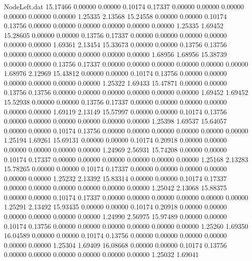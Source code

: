 \begin{filecontents}{NodeLeft.dat}
  15.17466    0.00000    0.00000     0.10174    0.17337    0.00000    0.00000    0.00000    0.00000    0.00000    0.00000    1.25335    2.13568
  15.24558    0.00000    0.00000     0.10174    0.13756    0.00000    0.00000    0.00000    0.00000    0.00000    0.00000    1.25335    1.69452
  15.28605    0.00000    0.00000     0.13756    0.17337    0.00000    0.00000    0.00000    0.00000    0.00000    0.00000    1.69361    2.13454
  15.33673    0.00000    0.00000     0.13756    0.13756    0.00000    0.00000    0.00000    0.00000    0.00000    0.00000    1.68956    1.68956
  15.38739    0.00000    0.00000     0.13756    0.17337    0.00000    0.00000    0.00000    0.00000    0.00000    0.00000    1.68976    2.12969
  15.43812    0.00000    0.00000     0.10174    0.13756    0.00000    0.00000    0.00000    0.00000    0.00000    0.00000    1.25322    1.69433
  15.47871    0.00000    0.00000     0.13756    0.13756    0.00000    0.00000    0.00000    0.00000    0.00000    0.00000    1.69452    1.69452
  15.52938    0.00000    0.00000     0.13756    0.17337    0.00000    0.00000    0.00000    0.00000    0.00000    0.00000    1.69119    2.13149
  15.57997    0.00000    0.00000     0.10174    0.13756    0.00000    0.00000    0.00000    0.00000    0.00000    0.00000    1.25398    1.69537
  15.64057    0.00000    0.00000     0.10174    0.13756    0.00000    0.00000    0.00000    0.00000    0.00000    0.00000    1.25194    1.69261
  15.69131    0.00000    0.00000     0.10174    0.20918    0.00000    0.00000    0.00000    0.00000    0.00000    0.00000    1.24969    2.56931
  15.74208    0.00000    0.00000     0.10174    0.17337    0.00000    0.00000    0.00000    0.00000    0.00000    0.00000    1.25168    2.13283
  15.78265    0.00000    0.00000     0.10174    0.17337    0.00000    0.00000    0.00000    0.00000    0.00000    0.00000    1.25232    2.13392
  15.83314    0.00000    0.00000     0.10174    0.17337    0.00000    0.00000    0.00000    0.00000    0.00000    0.00000    1.25042    2.13068
  15.88375    0.00000    0.00000     0.10174    0.17337    0.00000    0.00000    0.00000    0.00000    0.00000    0.00000    1.25291    2.13492
  15.93435    0.00000    0.00000     0.10174    0.20918    0.00000    0.00000    0.00000    0.00000    0.00000    0.00000    1.24990    2.56975
  15.97489    0.00000    0.00000     0.10174    0.13756    0.00000    0.00000    0.00000    0.00000    0.00000    0.00000    1.25260    1.69350
  16.04589    0.00000    0.00000     0.10174    0.13756    0.00000    0.00000    0.00000    0.00000    0.00000    0.00000    1.25304    1.69409
  16.08668    0.00000    0.00000     0.10174    0.13756    0.00000    0.00000    0.00000    0.00000    0.00000    0.00000    1.25032    1.69041

\end{filecontents}
